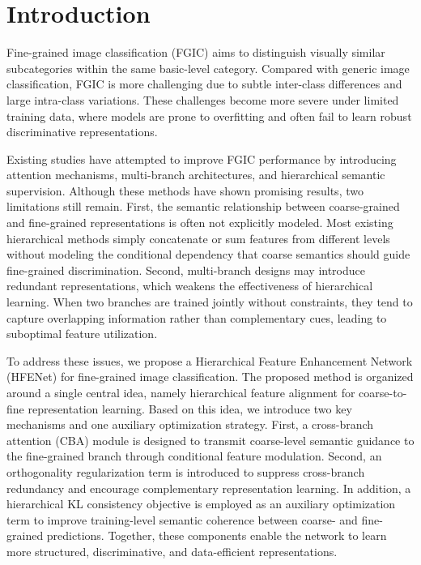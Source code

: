 \documentclass[pdflatex,sn-mathphys-num]{sn-jnl}
\theoremstyle{thmstyleone}%
\theoremstyle{thmstyletwo}%
\theoremstyle{thmstylethree}%
\begin{document}
\maketitle

\section{Introduction}
\label{sec:introduction}

Fine-grained image classification (FGIC) aims to distinguish visually similar subcategories within the same basic-level category. 
Compared with generic image classification, FGIC is more challenging due to subtle inter-class differences and large intra-class variations. 
These challenges become more severe under limited training data, where models are prone to overfitting and often fail to learn robust discriminative representations.

Existing studies have attempted to improve FGIC performance by introducing attention mechanisms, multi-branch architectures, and hierarchical semantic supervision. 
Although these methods have shown promising results, two limitations still remain. 
First, the semantic relationship between coarse-grained and fine-grained representations is often not explicitly modeled. 
Most existing hierarchical methods simply concatenate or sum features from different levels without modeling the conditional dependency that coarse semantics should guide fine-grained discrimination. 
Second, multi-branch designs may introduce redundant representations, which weakens the effectiveness of hierarchical learning. 
When two branches are trained jointly without constraints, they tend to capture overlapping information rather than complementary cues, leading to suboptimal feature utilization.

To address these issues, we propose a Hierarchical Feature Enhancement Network (HFENet) for fine-grained image classification. 
The proposed method is organized around a single central idea, namely hierarchical feature alignment for coarse-to-fine representation learning. 
Based on this idea, we introduce two key mechanisms and one auxiliary optimization strategy. 
First, a cross-branch attention (CBA) module is designed to transmit coarse-level semantic guidance to the fine-grained branch through conditional feature modulation. 
Second, an orthogonality regularization term is introduced to suppress cross-branch redundancy and encourage complementary representation learning. 
In addition, a hierarchical KL consistency objective is employed as an auxiliary optimization term to improve training-level semantic coherence between coarse- and fine-grained predictions. 
Together, these components enable the network to learn more structured, discriminative, and data-efficient representations.
\end{document}
